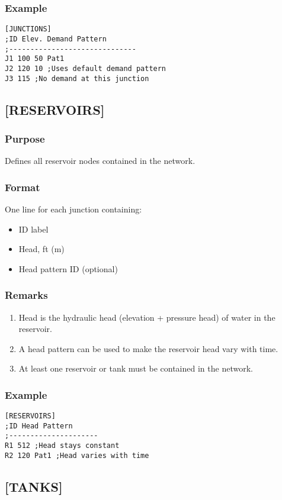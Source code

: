   \subsubsection{Example}
\begin{verbatim}[JUNCTIONS]
;ID Elev. Demand Pattern
;------------------------------
J1 100 50 Pat1
J2 120 10 ;Uses default demand pattern
J3 115 ;No demand at this junction
\end{verbatim}

\subsection{[RESERVOIRS]}
  \subsubsection{Purpose}
  Defines all reservoir nodes contained in the network.
  \subsubsection{Format}
    One line for each junction containing:
  \begin{itemize}
    \item ID label
    \item Head, ft (m)
    \item Head pattern ID (optional)
  \end{itemize}
  \subsubsection{Remarks}
  \begin{enumerate}
    \item Head is the hydraulic head (elevation + pressure head) of water in the reservoir.
    \item A head pattern can be used to make the reservoir head vary with time.
    \item At least one reservoir or tank must be contained in the network.
  \end{enumerate}
  \subsubsection{Example}
\begin{verbatim}[RESERVOIRS]
;ID Head Pattern
;---------------------
R1 512 ;Head stays constant
R2 120 Pat1 ;Head varies with time
\end{verbatim}

\subsection{[TANKS]}
